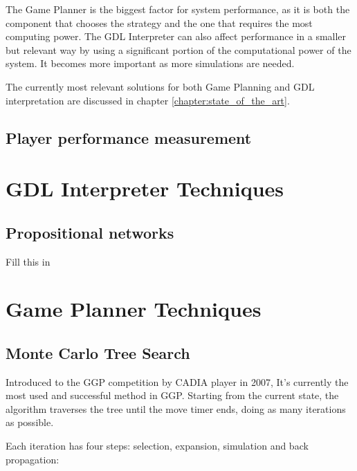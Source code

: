 The Game Planner is the biggest factor for system performance, as it is both the component that chooses the strategy and the one that requires the most computing power. The GDL Interpreter can also affect performance in a smaller but relevant way by using a significant portion of the computational power of the system. It becomes more important as more simulations are needed. 

The currently most relevant solutions for both Game Planning and GDL interpretation are discussed in chapter \ref{chapter:state_of_the_art}.

\subsection{Player performance measurement}


\section{GDL Interpreter Techniques}
\subsection{Propositional networks}

Fill this in


\section{Game Planner Techniques}
\subsection{Monte Carlo Tree Search}
Introduced to the GGP competition by CADIA player in 2007, It’s currently the most used and successful method in GGP. Starting from the current state, the algorithm traverses the tree until the move timer ends, doing as many iterations as possible.

Each iteration has four steps: selection, expansion, simulation and back propagation:

